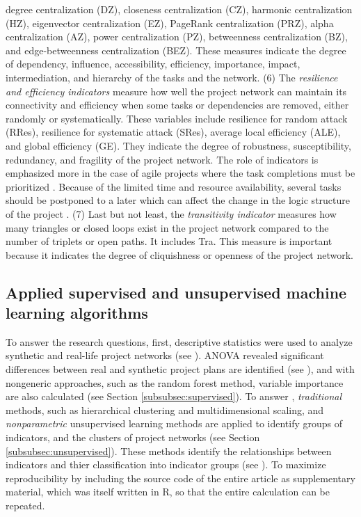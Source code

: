 \documentclass[preprint,
3p]{elsarticle} %
\begin{document}
degree centralization (DZ), closeness centralization (CZ), harmonic
centralization (HZ), eigenvector centralization (EZ), PageRank
centralization (PRZ), alpha centralization (AZ), power centralization
(PZ), betweenness centralization (BZ), and edge-betweenness
centralization (BEZ). These measures indicate the degree of dependency,
influence, accessibility, efficiency, importance, impact,
intermediation, and hierarchy of the tasks and the network. (6) The
\emph{resilience and efficiency indicators} measure how well the project
network can maintain its connectivity and efficiency when some tasks or
dependencies are removed, either randomly or systematically. These
variables include resilience for random attack (RRes), resilience for
systematic attack (SRes), average local efficiency (ALE), and global
efficiency (GE). They indicate the degree of robustness, susceptibility,
redundancy, and fragility of the project network. The role of indicators
is emphasized more in the case of agile projects where the task
completions must be prioritized \citep{CIRIC2019roleofflexibility}.
Because of the limited time and resource availability, several tasks
should be postponed to a later which can affect the change in the logic
structure of the project \citep{Kosztyan2015}. (7) Last but not least,
the \emph{transitivity indicator} measures how many triangles or closed
loops exist in the project network compared to the number of triplets or
open paths. It includes Tra. This measure is important because it
indicates the degree of cliquishness or openness of the project network.

\subsection{Applied supervised and unsupervised machine learning
algorithms}\label{subsec:algorithms}

To answer the research questions, first, descriptive statistics were
used to analyze synthetic and real-life project networks (see
). ANOVA revealed significant differences between real and
synthetic project plans are identified (see ), and with
nongeneric approaches, such as the random forest method, variable
importance are also calculated (see Section \ref{subsubsec:supervised}).
To answer , \emph{traditional} methods, such as
hierarchical clustering and multidimensional scaling, and
\emph{nonparametric} unsupervised learning methods are applied to
identify groups of indicators, and the clusters of project networks (see
Section \ref{subsubsec:unsupervised}). These methods identify the
relationships between indicators and thier classification into indicator
groups (see ). To maximize reproducibility by including the
source code of the entire article as supplementary material, which was
itself written in R, so that the entire calculation can be repeated.
\end{document}
